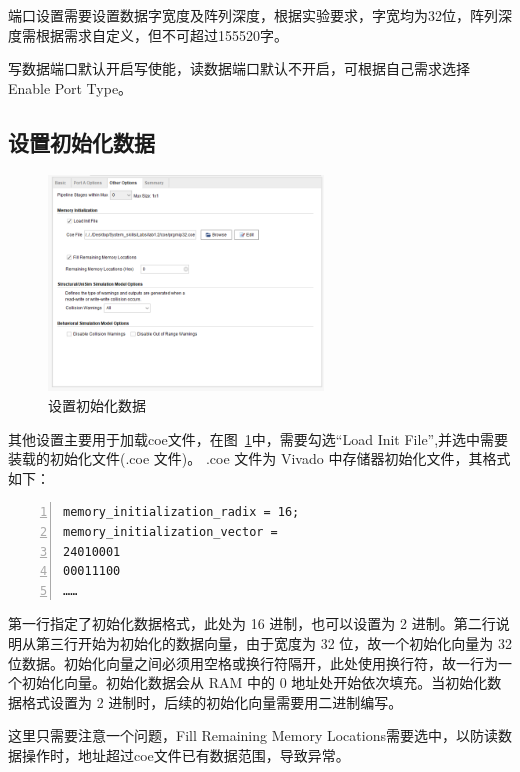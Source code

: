 端口设置需要设置数据字宽度及阵列深度，根据实验要求，字宽均为32位，阵列深度需根据需求自定义，但不可超过155520字。

写数据端口默认开启写使能，读数据端口默认不开启，可根据自己需求选择Enable Port Type。

\subsection{设置初始化数据}
\begin{figure}[htbp]
    \centering
    \includegraphics[width = 0.65\textwidth]{image/2_section/section_2_5.png}
    \caption{设置初始化数据}
    \label{fig:section_2_5}
\end{figure}

其他设置主要用于加载coe文件，在图~\ref{fig:section_2_5}中，需要勾选“Load Init File”,并选中需要装载的初始化文件(.coe 文件)。 .coe 文件为 Vivado 中存储器初始化文件，其格式如下：
\begin{lstlisting}[numbers=left,xleftmargin=5em,xrightmargin=5em, aboveskip=2em]
memory_initialization_radix = 16;
memory_initialization_vector =
24010001
00011100
……
\end{lstlisting}

第一行指定了初始化数据格式，此处为 16 进制，也可以设置为 2 进制。第二行说明从第三行开始为初始化的数据向量，由于宽度为 32 位，故一个初始化向量为 32 位数据。初始化向量之间必须用空格或换行符隔开，此处使用换行符，故一行为一个初始化向量。初始化数据会从 RAM 中的 0 地址处开始依次填充。当初始化数据格式设置为 2 进制时，后续的初始化向量需要用二进制编写。

这里只需要注意一个问题，Fill Remaining Memory Locations需要选中，以防读数据操作时，地址超过coe文件已有数据范围，导致异常。